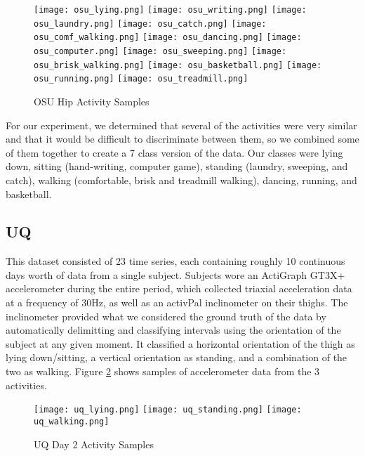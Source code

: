 \begin{figure}
 \centering
 \texttt{[image: osu\_lying.png]}
 \texttt{[image: osu\_writing.png]}
 \texttt{[image: osu\_laundry.png]}
 \texttt{[image: osu\_catch.png]}
 \texttt{[image: osu\_comf\_walking.png]}
 \texttt{[image: osu\_dancing.png]}
 \texttt{[image: osu\_computer.png]}
 \texttt{[image: osu\_sweeping.png]}
 \texttt{[image: osu\_brisk\_walking.png]}
 \texttt{[image: osu\_basketball.png]}
 \texttt{[image: osu\_running.png]}
 \texttt{[image: osu\_treadmill.png]}
 \caption{OSU Hip Activity Samples}
 \label{fig:osu_activities}
\end{figure}

For our experiment, we determined that several of the activities were very similar and that
it would be difficult to discriminate between them, so we combined some of them together to
create a 7 class version of the data.
Our classes were lying down, sitting (hand-writing, computer game),
standing (laundry, sweeping, and catch), walking (comfortable, brisk and treadmill walking),
dancing, running, and basketball.

\subsection{UQ}

This dataset consisted of 23 time series, each containing roughly 10 continuous
days worth of data from a single subject. Subjects wore an ActiGraph GT3X+
accelerometer during the entire period, which collected triaxial acceleration data at a frequency
of 30Hz, as well as an activPal inclinometer on their thighs. The inclinometer
provided what we considered the ground truth of the data by automatically
delimitting and classifying intervals using the orientation of the subject at any given moment. It 
classified a horizontal orientation of the thigh as lying down/sitting,
a vertical orientation as standing, and a combination of the two as walking. Figure
\ref{fig:uq_activities} shows samples of accelerometer data from the 3 activities.

\begin{figure}
 \centering
 \texttt{[image: uq\_lying.png]}
 \texttt{[image: uq\_standing.png]}
 \texttt{[image: uq\_walking.png]}
 \caption{UQ Day 2 Activity Samples}
 \label{fig:uq_activities}
\end{figure}

